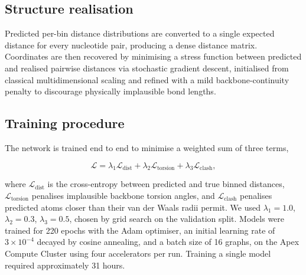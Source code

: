 \subsection{Structure realisation}
\label{sec:realisation}

Predicted per-bin distance distributions are converted to a single expected distance for every nucleotide pair, producing a dense distance matrix. Coordinates are then recovered by minimising a stress function between predicted and realised pairwise distances via stochastic gradient descent, initialised from classical multidimensional scaling and refined with a mild backbone-continuity penalty to discourage physically implausible bond lengths.

\subsection{Training procedure}
\label{sec:training}

The network is trained end to end to minimise a weighted sum of three terms,

\begin{equation}
\mathcal{L} = \lambda_1 \mathcal{L}_{\mathrm{dist}} + \lambda_2 \mathcal{L}_{\mathrm{torsion}} + \lambda_3 \mathcal{L}_{\mathrm{clash}},
\label{eq:loss}
\end{equation}

where $\mathcal{L}_{\mathrm{dist}}$ is the cross-entropy between predicted and true binned distances, $\mathcal{L}_{\mathrm{torsion}}$ penalises implausible backbone torsion angles, and $\mathcal{L}_{\mathrm{clash}}$ penalises predicted atoms closer than their van der Waals radii permit. We used $\lambda_1{=}1.0$, $\lambda_2{=}0.3$, $\lambda_3{=}0.5$, chosen by grid search on the validation split. Models were trained for 220 epochs with the Adam optimiser, an initial learning rate of $3\times10^{-4}$ decayed by cosine annealing, and a batch size of 16 graphs, on the Apex Compute Cluster using four accelerators per run. Training a single model required approximately 31 hours.
